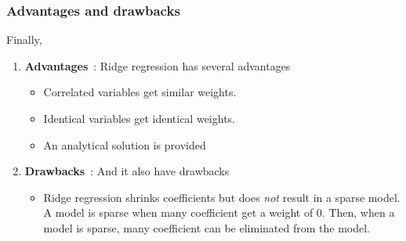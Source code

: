 \documentclass[a4paper,12pt]{article}
\begin{document}
\subsubsection{Advantages and drawbacks}
Finally,
\begin{enumerate}
\item \textbf{Advantages}~: Ridge regression has several advantages
\begin{itemize}
\item Correlated variables get similar weights.
\item Identical variables get identical weights.
\item An analytical solution is provided
\end{itemize}
\item \textbf{Drawbacks}~: And it also have drawbacks
\begin{itemize}
\item Ridge regression shrinks coefficients but does \emph{not} result in a sparse model. A model is sparse when many coefficient get a weight of $0$. Then, when a model is sparse, many coefficient can be eliminated from the model.
\end{itemize} 
\end{enumerate}
\end{document}
